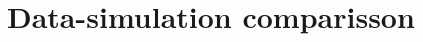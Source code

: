 
\section{Data-simulation comparisson}
\label{a:DataMC}

\renewcommand{\thefigure}{L.\arabic{figure}}

%

%


